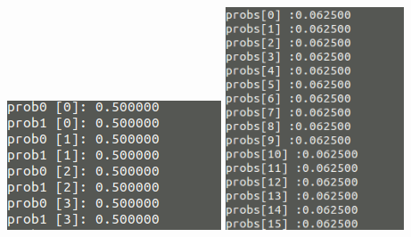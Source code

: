 \documentclass{apuntes}
\begin{document}
\begin{itemize}
	\begin{center}
		\includegraphics[width=180pt]{SACBICDES1.png}
		\includegraphics[width=150pt]{SACBICDES2.png}
	\end{center}
\end{itemize} 

\printindex
\end{document}
